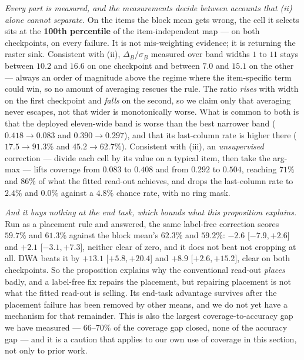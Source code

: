 \emph{Every part is measured, and the measurements decide between accounts that (ii) alone cannot separate.}
On the items the block mean gets wrong, the cell it selects sits at the \textbf{100th percentile} of the
item-independent map --- on both checkpoints, on every failure. It is not mis-weighting evidence; it is returning
the raster sink. Consistent with (ii), $\Delta_B/\sigma_B$ measured over band widths $1$ to $11$ stays between $10.2$ and $16.6$
on one checkpoint and between $7.0$ and $15.1$ on the other --- always an order of magnitude above the regime
where the item-specific term could win, so no amount of averaging rescues the rule. The ratio \emph{rises} with
width on the first checkpoint and \emph{falls} on the second, so we claim only that averaging never escapes, not
that wider is monotonically worse. What is common to both is that the deployed eleven-wide band is worse than the
best narrower band ($0.418\to0.083$ and $0.390\to0.297$), and that its last-column rate is higher there
($17.5\to91.3\%$ and $45.2\to62.7\%$). Consistent with (iii), an \emph{unsupervised} correction --- divide each cell by its value on a typical
item, then take the arg-max --- lifts coverage from $0.083$ to $0.408$ and from $0.292$ to $0.504$, reaching
$71\%$ and $86\%$ of what the fitted read-out achieves, and drops the last-column rate to $2.4\%$ and $0.0\%$
against a $4.8\%$ chance rate, with no ring mask.

\emph{And it buys nothing at the end task, which bounds what this proposition explains.} Run as a placement rule
and answered, the same label-free correction scores $59.7\%$ and $61.3\%$ against the block mean's $62.3\%$ and
$59.2\%$: $-2.6$ [$-7.9,+2.6$] and $+2.1$ [$-3.1,+7.3$], neither clear of zero, and it does not beat not cropping
at all. DWA beats it by $+13.1$ [$+5.8,+20.4$] and $+8.9$ [$+2.6,+15.2$], clear on both checkpoints. So the
proposition explains why the conventional read-out \emph{places} badly, and a label-free fix repairs the
placement, but repairing placement is not what the fitted read-out is selling. Its end-task advantage survives
after the placement failure has been removed by other means, and we do not yet have a mechanism for that
remainder. This is also the largest coverage-to-accuracy gap we have measured --- $66$--$70\%$ of the coverage gap
closed, none of the accuracy gap --- and it is a caution that applies to our own use of coverage in this section,
not only to prior work.

